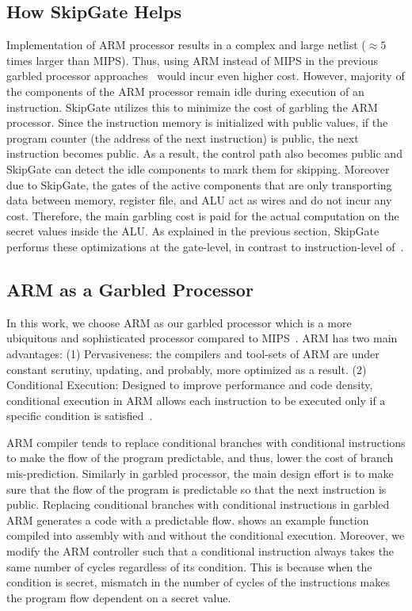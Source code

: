 \subsection{How SkipGate Helps}
Implementation of ARM processor results in a complex and large netlist ($\approx 5$ times larger than MIPS).
Thus, using ARM instead of MIPS in the previous garbled processor approaches~\cite{wang2015secure, songhori2016garbledcpu} would incur even higher cost.
However, majority of the components of the ARM processor remain idle during  execution of an instruction.
SkipGate utilizes this to minimize the cost of garbling the ARM processor.
Since the instruction memory is initialized with public values, if the program counter (the address of the next instruction) is public, the next instruction becomes public.
As a result, the control path also becomes public and SkipGate can detect the idle components to mark them for skipping.
Moreover due to SkipGate, the gates of the active components that are only transporting data between memory, register file, and ALU act as wires and do not incur any cost.
Therefore, the main garbling cost is paid for the actual computation on the secret values inside the ALU.
As explained in the previous section, SkipGate performs these optimizations at the gate-level, in contrast to instruction-level of~\cite{wang2015secure, songhori2016garbledcpu}.

\subsection{ARM as a Garbled Processor}\label{ssec:arm}
In this work, we choose ARM as our garbled processor which is a more ubiquitous and sophisticated processor compared to MIPS~\cite{songhori2015tinygarble, wang2015secure, songhori2016garbledcpu}.
ARM has two main advantages:
(1) Pervasiveness: the compilers and tool-sets of ARM are under constant scrutiny, updating, and probably, more optimized as a result.
(2) Conditional Execution: Designed to improve performance and code density, conditional execution in ARM allows each instruction to be executed only if a specific condition is satisfied~\cite{sloss2004arm}.

ARM compiler tends to replace conditional branches with conditional instructions to make the flow of the program predictable, and thus, lower the cost of branch mis-prediction.
Similarly in garbled processor, the main design effort is to make sure that the flow of the program is predictable so that the next instruction is public.
Replacing conditional branches with conditional instructions in garbled ARM generates a code with a predictable flow.
 shows an example function compiled into assembly with and without the conditional execution.
Moreover, we modify the ARM controller such that a conditional instruction always takes the same number of cycles regardless of its condition.
This is because when the condition is secret, mismatch in the number of cycles of the instructions makes the program flow dependent on a secret value.

